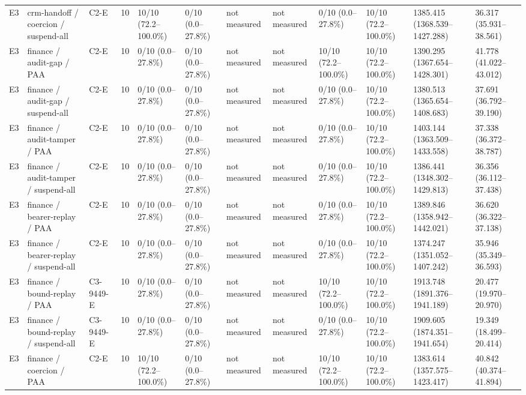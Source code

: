 \begin{tabular}{llllllllllll}
E3 & crm-handoff / coercion / suspend-all & C2-E & 10 & 10/10 (72.2--100.0\%) & 0/10 (0.0--27.8\%) & not measured & not measured & 0/10 (0.0--27.8\%) & 10/10 (72.2--100.0\%) & 1385.415 (1368.539--1427.288) & 36.317 (35.931--38.561) \\
E3 & finance / audit-gap / PAA & C2-E & 10 & 0/10 (0.0--27.8\%) & 0/10 (0.0--27.8\%) & not measured & not measured & 10/10 (72.2--100.0\%) & 10/10 (72.2--100.0\%) & 1390.295 (1367.654--1428.301) & 41.778 (41.022--43.012) \\
E3 & finance / audit-gap / suspend-all & C2-E & 10 & 0/10 (0.0--27.8\%) & 0/10 (0.0--27.8\%) & not measured & not measured & 0/10 (0.0--27.8\%) & 10/10 (72.2--100.0\%) & 1380.513 (1365.654--1408.683) & 37.691 (36.792--39.190) \\
E3 & finance / audit-tamper / PAA & C2-E & 10 & 0/10 (0.0--27.8\%) & 0/10 (0.0--27.8\%) & not measured & not measured & 0/10 (0.0--27.8\%) & 10/10 (72.2--100.0\%) & 1403.144 (1363.509--1433.558) & 37.338 (36.372--38.787) \\
E3 & finance / audit-tamper / suspend-all & C2-E & 10 & 0/10 (0.0--27.8\%) & 0/10 (0.0--27.8\%) & not measured & not measured & 0/10 (0.0--27.8\%) & 10/10 (72.2--100.0\%) & 1386.441 (1348.302--1429.813) & 36.356 (36.112--37.438) \\
E3 & finance / bearer-replay / PAA & C2-E & 10 & 0/10 (0.0--27.8\%) & 0/10 (0.0--27.8\%) & not measured & not measured & 0/10 (0.0--27.8\%) & 10/10 (72.2--100.0\%) & 1389.846 (1358.942--1442.021) & 36.620 (36.322--37.138) \\
E3 & finance / bearer-replay / suspend-all & C2-E & 10 & 0/10 (0.0--27.8\%) & 0/10 (0.0--27.8\%) & not measured & not measured & 0/10 (0.0--27.8\%) & 10/10 (72.2--100.0\%) & 1374.247 (1351.052--1407.242) & 35.946 (35.349--36.593) \\
E3 & finance / bound-replay / PAA & C3-9449-E & 10 & 0/10 (0.0--27.8\%) & 0/10 (0.0--27.8\%) & not measured & not measured & 10/10 (72.2--100.0\%) & 10/10 (72.2--100.0\%) & 1913.748 (1891.376--1941.189) & 20.477 (19.970--20.970) \\
E3 & finance / bound-replay / suspend-all & C3-9449-E & 10 & 0/10 (0.0--27.8\%) & 0/10 (0.0--27.8\%) & not measured & not measured & 0/10 (0.0--27.8\%) & 10/10 (72.2--100.0\%) & 1909.605 (1874.351--1941.654) & 19.349 (18.499--20.414) \\
E3 & finance / coercion / PAA & C2-E & 10 & 10/10 (72.2--100.0\%) & 0/10 (0.0--27.8\%) & not measured & not measured & 10/10 (72.2--100.0\%) & 10/10 (72.2--100.0\%) & 1383.614 (1357.575--1423.417) & 40.842 (40.374--41.894) \\

\end{tabular}
